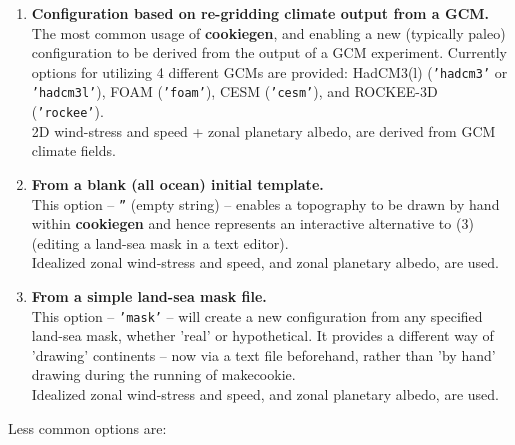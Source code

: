 \begin{enumerate}[noitemsep]
\setlength{\itemindent}{.2in}
\setcounter{enumi}{0}
\vspace{1mm}
\item \textbf{Configuration based on re-gridding climate output from a GCM.}
\\ The most common usage of \textbf{cookiegen}, and enabling a new (typically paleo) configuration to be derived from the output of a GCM experiment. Currently options for utilizing 4 different GCMs are provided: HadCM3(l) (\texttt{'hadcm3'} or \texttt{'hadcm3l'}), FOAM (\texttt{'foam'}), CESM (\texttt{'cesm'}), and ROCKEE-3D (\texttt{'rockee'}).\\2D wind-stress and speed + zonal planetary albedo, are derived from GCM climate fields.
\vspace{1mm}
\item \textbf{From a blank (all ocean) initial template.}
\\ This option -- \texttt{''} (empty string) -- enables a topography to be drawn by hand within \textbf{cookiegen} and hence represents an interactive alternative to (3) (editing a land-sea mask in a text editor).\\Idealized zonal wind-stress and speed, and zonal planetary albedo, are used.
\vspace{1mm}
\item \textbf{From a simple land-sea mask file.}
\\ This option -- \texttt{'mask'} -- will create a new configuration from any specified land-sea mask, whether 'real' or hypothetical. It provides a different way of 'drawing' continents -- now via a text file beforehand, rather than 'by hand' drawing during the running of \textsf{\footnotesize makecookie}.\\Idealized zonal wind-stress and speed, and zonal planetary albedo, are used.
\end{enumerate}

\vspace{1mm}
\noindent Less common options are:

